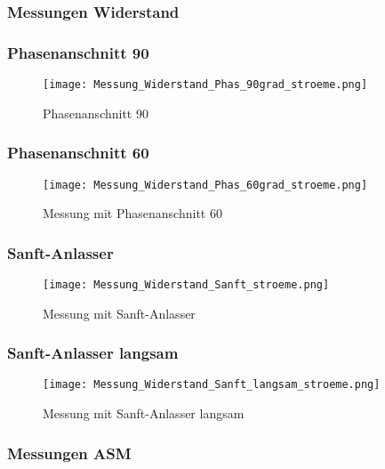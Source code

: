 \subsubsection{Messungen Widerstand}

\subsubsection*{Phasenanschnitt 90\textdegree}
\begin{figure}[ht!]
	\centering
	\texttt{[image: Messung\_Widerstand\_Phas\_90grad\_stroeme.png]}	
	\caption{Phasenanschnitt 90\textdegree}\label{fig:Mess_Widerstand_Phas_90grad_stroeme}
\end{figure}

\newpage
\subsubsection*{Phasenanschnitt 60\textdegree}
\begin{figure}[ht!]
	\centering
	\texttt{[image: Messung\_Widerstand\_Phas\_60grad\_stroeme.png]}	
	\caption{Messung mit Phasenanschnitt 60\textdegree}\label{fig:Mess_Widerstand_Phas_60grad_stroeme}
\end{figure}

\newpage
\subsubsection*{Sanft-Anlasser}
\begin{figure}[ht!]
	\centering
	\texttt{[image: Messung\_Widerstand\_Sanft\_stroeme.png]}	
	\caption{Messung mit Sanft-Anlasser}\label{fig:Mess_Widerstand_Sanft_stroeme}
\end{figure}

\newpage
\subsubsection*{Sanft-Anlasser langsam}
\begin{figure}[ht!]
	\centering
	\texttt{[image: Messung\_Widerstand\_Sanft\_langsam\_stroeme.png]}	
	\caption{Messung mit Sanft-Anlasser langsam}\label{fig:Mess_Widerstand_Sanft_langsam_stroeme}
\end{figure}


\newpage
\subsubsection{Messungen ASM}

